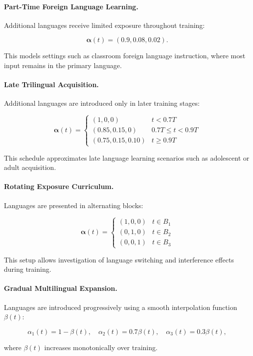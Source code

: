 \paragraph{Part-Time Foreign Language Learning.}
Additional languages receive limited exposure throughout training:

\[
\boldsymbol{\alpha}(t) = (0.9,0.08,0.02).
\]

This models settings such as classroom foreign language instruction, where most input remains in the primary language.

\paragraph{Late Trilingual Acquisition.}
Additional languages are introduced only in later training stages:

\[
\boldsymbol{\alpha}(t) =
\begin{cases}
(1,0,0) & t < 0.7T \\
(0.85,0.15,0) & 0.7T \le t < 0.9T \\
(0.75,0.15,0.10) & t \ge 0.9T
\end{cases}
\]

This schedule approximates late language learning scenarios such as adolescent or adult acquisition.

\paragraph{Rotating Exposure Curriculum.}
Languages are presented in alternating blocks:

\[
\boldsymbol{\alpha}(t) =
\begin{cases}
(1,0,0) & t \in B_1 \\
(0,1,0) & t \in B_2 \\
(0,0,1) & t \in B_3
\end{cases}
\]

This setup allows investigation of language switching and interference effects during training.

\paragraph{Gradual Multilingual Expansion.}
Languages are introduced progressively using a smooth interpolation function $\beta(t)$:

\[
\alpha_1(t) = 1 - \beta(t), \quad
\alpha_2(t) = 0.7\beta(t), \quad
\alpha_3(t) = 0.3\beta(t),
\]

where $\beta(t)$ increases monotonically over training. 

